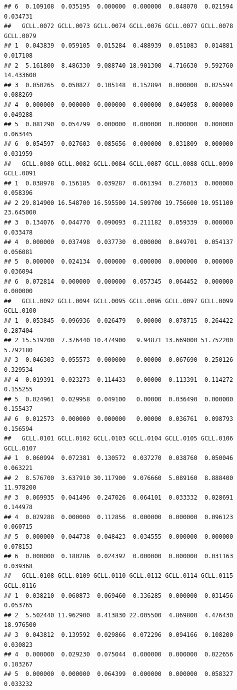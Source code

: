 \documentclass[
]{article}
\begin{document}
\begin{verbatim}
## 6  0.109108  0.035195  0.000000  0.000000  0.048070  0.021594  0.034731
##   GCLL.0072 GCLL.0073 GCLL.0074 GCLL.0076 GCLL.0077 GCLL.0078 GCLL.0079
## 1  0.043839  0.059105  0.015284  0.488939  0.051083  0.014881  0.017108
## 2  5.161800  8.486330  9.088740 18.901300  4.716630  9.592760 14.433600
## 3  0.050265  0.050827  0.105148  0.152894  0.000000  0.025594  0.088269
## 4  0.000000  0.000000  0.000000  0.000000  0.049058  0.000000  0.049288
## 5  0.081290  0.054799  0.000000  0.000000  0.000000  0.000000  0.063445
## 6  0.054597  0.027603  0.085656  0.000000  0.031809  0.000000  0.031959
##   GCLL.0080 GCLL.0082 GCLL.0084 GCLL.0087 GCLL.0088 GCLL.0090 GCLL.0091
## 1  0.038978  0.156185  0.039287  0.061394  0.276013  0.000000  0.058396
## 2 29.814900 16.548700 16.595500 14.509700 19.756600 10.951100 23.645000
## 3  0.134076  0.044770  0.090093  0.211182  0.059339  0.000000  0.033478
## 4  0.000000  0.037498  0.037730  0.000000  0.049701  0.054137  0.056081
## 5  0.000000  0.024134  0.000000  0.000000  0.000000  0.000000  0.036094
## 6  0.072814  0.000000  0.000000  0.057345  0.064452  0.000000  0.000000
##   GCLL.0092 GCLL.0094 GCLL.0095 GCLL.0096 GCLL.0097 GCLL.0099 GCLL.0100
## 1  0.053845  0.096936  0.026479   0.00000  0.078715  0.264422  0.287404
## 2 15.519200  7.376440 10.474900   9.94871 13.669000 51.752200  5.792180
## 3  0.046303  0.055573  0.000000   0.00000  0.067690  0.250126  0.329534
## 4  0.019391  0.023273  0.114433   0.00000  0.113391  0.114272  0.155255
## 5  0.024961  0.029958  0.049100   0.00000  0.036490  0.000000  0.155437
## 6  0.012573  0.000000  0.000000   0.00000  0.036761  0.098793  0.156594
##   GCLL.0101 GCLL.0102 GCLL.0103 GCLL.0104 GCLL.0105 GCLL.0106 GCLL.0107
## 1  0.060994  0.072381  0.130572  0.037270  0.038760  0.050046  0.063221
## 2  8.576700  3.637910 30.117900  9.076660  5.089160  8.888400 11.978200
## 3  0.069935  0.041496  0.247026  0.064101  0.033332  0.028691  0.144978
## 4  0.029288  0.000000  0.112856  0.000000  0.000000  0.096123  0.060715
## 5  0.000000  0.044738  0.048423  0.034555  0.000000  0.000000  0.078153
## 6  0.000000  0.180286  0.024392  0.000000  0.000000  0.031163  0.039368
##   GCLL.0108 GCLL.0109 GCLL.0110 GCLL.0112 GCLL.0114 GCLL.0115 GCLL.0116
## 1  0.038210  0.060873  0.069460  0.336285  0.000000  0.031456  0.053765
## 2  5.502440 11.962900  8.413830 22.005500  4.869800  4.476430 18.976500
## 3  0.043812  0.139592  0.029866  0.072296  0.094166  0.108200  0.030823
## 4  0.000000  0.029230  0.075044  0.000000  0.000000  0.022656  0.103267
## 5  0.000000  0.000000  0.064399  0.000000  0.000000  0.058327  0.033232

\end{verbatim}
\end{document}
